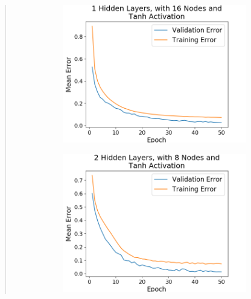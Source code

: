 \documentclass{article}
\begin{document}
\begin{quote}
\begin{figure}[h!]
\begin{subfigure}[h]{0.23\textwidth}
		\includegraphics[width=\textwidth]{figs/Iris_Multiclass_Classification_1_Hidden_Layers_with_16_Nodes_and_Tanh_Activation.png}
	\end{subfigure}
	\begin{subfigure}[h]{0.23\textwidth}
		\includegraphics[width=\textwidth]{figs/Iris_Multiclass_Classification_2_Hidden_Layers_with_8_Nodes_and_Tanh_Activation.png}
	\end{subfigure}
	\begin{subfigure}[h]{0.23\textwidth}

\end{subfigure}
\end{figure}
\end{quote}
\end{document}
